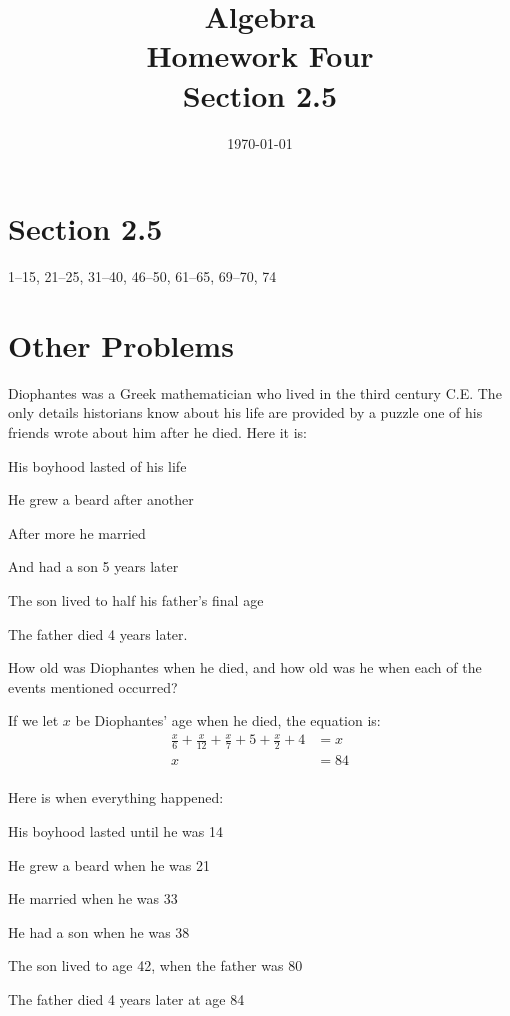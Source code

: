 \documentclass[letterpaper]{exam}
\title{Algebra \\ Homework Four \\ Section 2.5}
\author{}
\date{\today}
\begin{document}
  \maketitle

  \section{Section 2.5}
  1--15, 21--25, 31--40, 46--50, 61--65, 69--70, 74

  \section{Other Problems}

  Diophantes was a Greek mathematician who lived in the third century C.E.  The only details
  historians know about his life are provided by a puzzle one of his friends wrote about him after
  he died.  Here it is:

  \begin{itemize*}
    \item His boyhood lasted  of his life
    \item He grew a beard after another 
    \item After  more he married
    \item And had a son 5 years later
    \item The son lived to half his father's final age
    \item The father died 4 years later.
  \end{itemize*}

  How old was Diophantes when he died, and how old was he when each of the events mentioned occurred?

  \begin{solution}
    If we let $x$ be Diophantes' age when he died, the equation is:
    \begin{align*}
      \frac{x}{6} + \frac{x}{12} + \frac{x}{7} + 5 + \frac{x}{2} + 4 & = x \\
      x                                                              & = \boxed{84} \\
    \end{align*}

    Here is when everything happened:
    \begin{itemize*}
      \item His boyhood lasted until he was 14
      \item He grew a beard when he was 21 
      \item He married when he was 33
      \item He had a son when he was 38
      \item The son lived to age 42, when the father was 80
      \item The father died 4 years later at age 84
    \end{itemize*}

  \end{solution}
\end{document}
